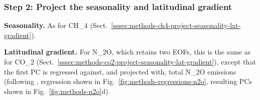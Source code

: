 \subsubsection{Step 2: Project the seasonality and latitudinal gradient}
\label{sssec:methods-n2o-like-project-seasonality-lat-gradient}

\textbf{Seasonality.}
As for CH_4 (Sect.~\ref{sssec:methods-ch4-project-seasonality-lat-gradient}).

\textbf{Latitudinal gradient.}
For N_2O, which retains two EOFs,
this is the same as for CO_2 (Sect.~\ref{sssec:methods-co2-project-seasonality-lat-gradient}),
except that the first PC is regressed against, and projected with, total N_2O emissions
(following \citealp{meinshausen_ssp-ghgs_2020}, regression shown in Fig.~\ref{fig:methods-regressions-n2o},
resulting PCs shown in Fig.~\ref{fig:methods-n2o}d).
%

